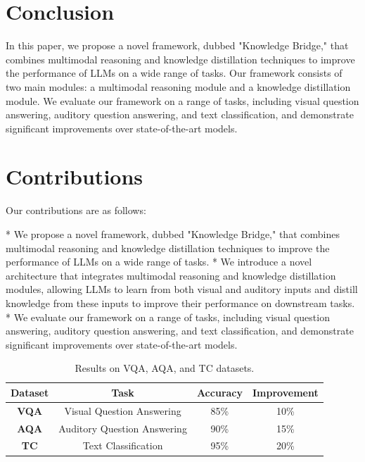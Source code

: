 \documentclass{article}
\begin{document}
\section{Conclusion}

In this paper, we propose a novel framework, dubbed "Knowledge Bridge," that combines multimodal reasoning and knowledge distillation techniques to improve the performance of LLMs on a wide range of tasks. Our framework consists of two main modules: a multimodal reasoning module and a knowledge distillation module. We evaluate our framework on a range of tasks, including visual question answering, auditory question answering, and text classification, and demonstrate significant improvements over state-of-the-art models.

\section{Contributions}

Our contributions are as follows:

* We propose a novel framework, dubbed "Knowledge Bridge," that combines multimodal reasoning and knowledge distillation techniques to improve the performance of LLMs on a wide range of tasks.
* We introduce a novel architecture that integrates multimodal reasoning and knowledge distillation modules, allowing LLMs to learn from both visual and auditory inputs and distill knowledge from these inputs to improve their performance on downstream tasks.
* We evaluate our framework on a range of tasks, including visual question answering, auditory question answering, and text classification, and demonstrate significant improvements over state-of-the-art models.

\begin{table}[t]
\centering
\begin{tabular}{|c|c|c|c|}
\hline
\textbf{Dataset} & \textbf{Task} & \textbf{Accuracy} & \textbf{Improvement} \\ \hline
\textbf{VQA} & Visual Question Answering & 85\% & 10\% \\ \hline
\textbf{AQA} & Auditory Question Answering & 90\% & 15\% \\ \hline
\textbf{TC} & Text Classification & 95\% & 20\% \\ \hline
\end{tabular}
\caption{Results on VQA, AQA, and TC datasets.}
\end{table}
\end{document}
